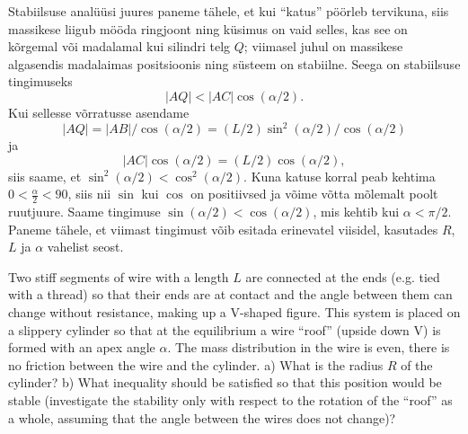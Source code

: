 {\begin{center}
\end{center}

Stabiilsuse analüüsi juures paneme tähele, et kui \enquote{katus} pöörleb tervikuna, siis massikese liigub mööda ringjoont ning küsimus on vaid selles, kas see on kõrgemal või madalamal kui silindri telg $Q$; viimasel juhul on massikese algasendis madalaimas positsioonis ning süsteem on stabiilne. Seega on stabiilsuse tingimuseks
$$|AQ|<|AC|\cos(\alpha/2).$$
Kui sellesse võrratusse asendame
$$|AQ|=|AB|/\cos(\alpha/2)=(L/2)\sin^2(\alpha/2)/\cos(\alpha/2)$$
ja $$|AC|\cos(\alpha/2)=(L/2)\cos(\alpha/2),$$ siis
saame, et $\sin^2(\alpha/2) < \cos^2(\alpha/2)$. Kuna katuse korral peab kehtima $0<\frac{\alpha}{2}<90$, siis nii $\sin$ kui $\cos$ on positiivsed ja võime võtta mõlemalt poolt ruutjuure. Saame tingimuse $\sin(\alpha/2) < \cos(\alpha/2)$, mis kehtib kui $\alpha<\pi/2$. Paneme tähele, et viimast tingimust võib esitada erinevatel viisidel, kasutades $R$, $L$ ja $\alpha$ vahelist seost.
\fi


\ifEngStatement
Two stiff segments of wire with a length $L$ are connected at the ends (e.g. tied with a thread) so that their ends are at contact and the angle between them can change without resistance, making up a V-shaped figure. This system is placed on a slippery cylinder so that at the equilibrium a wire “roof” (upside down V) is formed with an apex angle $\alpha$. The mass distribution in the wire is even, there is no friction between the wire and the cylinder. a) What is the radius $R$ of the cylinder? b) What inequality should be satisfied so that this position would be stable (investigate the stability only with respect to the rotation of the “roof” as a whole, assuming that the angle between the wires does not change)?
\fi


}
